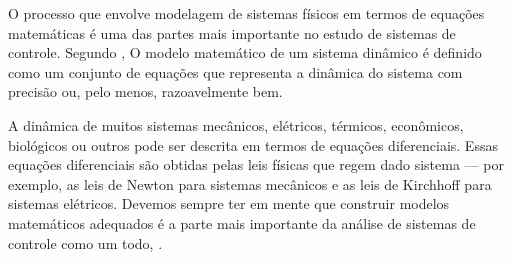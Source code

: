 O processo que envolve modelagem de sistemas físicos em termos de equações matemáticas é uma das partes mais importante no estudo de sistemas de controle. Segundo , O modelo matemático de um sistema dinâmico é definido como um conjunto de equações que representa a dinâmica do sistema com precisão ou, pelo menos, razoavelmente bem.

\begin{citacao}
	A dinâmica de muitos sistemas mecânicos, elétricos, térmicos, econômicos, biológicos ou
	outros pode ser descrita em termos de equações diferenciais. Essas equações diferenciais são	obtidas pelas leis físicas que regem dado sistema — por exemplo, as leis de Newton para sistemas mecânicos e as leis de Kirchhoff para sistemas elétricos. Devemos sempre ter em mente que construir modelos matemáticos adequados é a parte mais importante da análise de sistemas de controle como um todo, .
	
\end{citacao}